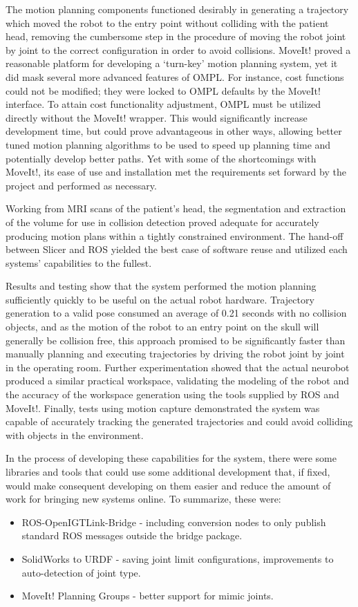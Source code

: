 \documentclass[12pt]{report}
\begin{document}
The motion planning components functioned desirably in generating a trajectory which moved the robot to the entry point without colliding with the patient head, removing the cumbersome step in the procedure of moving the robot joint by joint to the correct configuration in order to avoid collisions. MoveIt! proved a reasonable platform for developing a `turn-key' motion planning system, yet it did mask several more advanced features of OMPL. For instance, cost functions could not be modified; they were locked to OMPL defaults by the MoveIt! interface. \cite{moveitIssue} To attain cost functionality adjustment, OMPL must be utilized directly without the MoveIt! wrapper. This would significantly increase development time, but could prove advantageous in other ways, allowing better tuned motion planning algorithms to be used to speed up planning time and potentially develop better paths. Yet with some of the shortcomings with MoveIt!, its ease of use and installation met the requirements set forward by the project and performed as necessary.

Working from MRI scans of the patient's head, the segmentation and extraction of the volume for use in collision detection proved adequate for accurately producing motion plans within a tightly constrained environment. The hand-off between Slicer and ROS yielded the best case of software reuse and utilized each systems' capabilities to the fullest. 

Results and testing show that the system performed the motion planning sufficiently quickly to be useful on the actual robot hardware. Trajectory generation to a valid pose consumed an average of 0.21 seconds with no collision objects, and as the motion of the robot to an entry point on the skull will generally be collision free, this approach promised to be significantly faster than manually planning and executing trajectories by driving the robot joint by joint in the operating room. Further experimentation showed that the actual neurobot produced a similar practical workspace, validating the modeling of the robot and the accuracy of the workspace generation using the tools supplied by ROS and MoveIt!. Finally, tests using motion capture demonstrated the system was capable of accurately tracking the generated trajectories and could avoid colliding with objects in the environment.

In the process of developing these capabilities for the system, there were some libraries and tools that could use some additional development that, if fixed, would make consequent developing on them easier and reduce the amount of work for bringing new systems online. To summarize, these were:
\begin{itemize}
\item ROS-OpenIGTLink-Bridge - including conversion nodes to only publish standard ROS messages outside the bridge package.
\item SolidWorks to URDF - saving joint limit configurations, improvements to auto-detection of joint type.
\item MoveIt! Planning Groups - better support for mimic joints.
\end{itemize}
\end{document}
